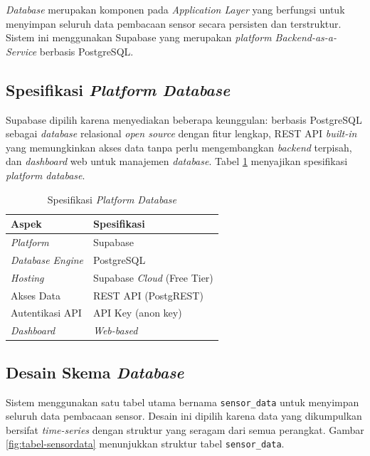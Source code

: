 \textit{Database} merupakan komponen pada \textit{Application Layer} yang berfungsi untuk menyimpan seluruh data pembacaan sensor secara persisten dan terstruktur. Sistem ini menggunakan Supabase yang merupakan \textit{platform Backend-as-a-Service} berbasis PostgreSQL.

\subsection{Spesifikasi \textit{Platform Database}}

Supabase dipilih karena menyediakan beberapa keunggulan: berbasis PostgreSQL sebagai \textit{database} relasional \textit{open source} dengan fitur lengkap, REST API \textit{built-in} yang memungkinkan akses data tanpa perlu mengembangkan \textit{backend} terpisah, dan \textit{dashboard} web untuk manajemen \textit{database}. Tabel \ref{tab:spesifikasi-database} menyajikan spesifikasi \textit{platform database}.

\begin{table}[H]
  \caption{Spesifikasi \textit{Platform Database}}
  \label{tab:spesifikasi-database}
  \begin{tabularx}{\textwidth}{| p{4cm} | X |}
    \hline
    \textbf{Aspek} & \textbf{Spesifikasi} \\
    \hline
    \textit{Platform} & Supabase \\
    \hline
    \textit{Database Engine} & PostgreSQL \\
    \hline
    \textit{Hosting} & Supabase \textit{Cloud} (Free Tier) \\
    \hline
    Akses Data & REST API (PostgREST) \\
    \hline
    Autentikasi API & API Key (anon key) \\
    \hline
    \textit{Dashboard} & \textit{Web-based} \\
    \hline
  \end{tabularx}
\end{table}

\subsection{Desain Skema \textit{Database}}

Sistem menggunakan satu tabel utama bernama \texttt{sensor\_data} untuk menyimpan seluruh data pembacaan sensor. Desain ini dipilih karena data yang dikumpulkan bersifat \textit{time-series} dengan struktur yang seragam dari semua perangkat. Gambar \ref{fig:tabel-sensordata} menunjukkan struktur tabel \texttt{sensor\_data}.

